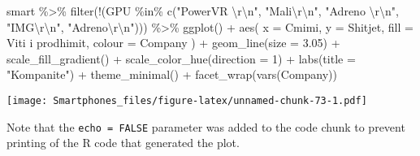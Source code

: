\documentclass[
]{article}
\newenvironment{Shaded}{\begin{snugshade}}{\end{snugshade}}
\newcommand{\AttributeTok}[1]{\textcolor[rgb]{0.77,0.63,0.00}{#1}}
\newcommand{\DecValTok}[1]{\textcolor[rgb]{0.00,0.00,0.81}{#1}}
\newcommand{\FloatTok}[1]{\textcolor[rgb]{0.00,0.00,0.81}{#1}}
\newcommand{\FunctionTok}[1]{\textcolor[rgb]{0.00,0.00,0.00}{#1}}
\newcommand{\NormalTok}[1]{#1}
\newcommand{\SpecialCharTok}[1]{\textcolor[rgb]{0.00,0.00,0.00}{#1}}
\newcommand{\StringTok}[1]{\textcolor[rgb]{0.31,0.60,0.02}{#1}}
\begin{document}
\begin{Shaded}
\begin{Highlighting}[]
\NormalTok{smart }\SpecialCharTok{\%\textgreater{}\%}
 \FunctionTok{filter}\NormalTok{(}\SpecialCharTok{!}\NormalTok{(GPU }\SpecialCharTok{\%in\%} \FunctionTok{c}\NormalTok{(}\StringTok{"PowerVR }\SpecialCharTok{\textbackslash{}r\textbackslash{}n}\StringTok{"}\NormalTok{, }\StringTok{"Mali}\SpecialCharTok{\textbackslash{}r\textbackslash{}n}\StringTok{"}\NormalTok{, }\StringTok{"Adreno }\SpecialCharTok{\textbackslash{}r\textbackslash{}n}\StringTok{"}\NormalTok{, }\StringTok{"IMG}\SpecialCharTok{\textbackslash{}r\textbackslash{}n}\StringTok{"}\NormalTok{, }\StringTok{"Adreno}\SpecialCharTok{\textbackslash{}r\textbackslash{}n}\StringTok{"}\NormalTok{))) }\SpecialCharTok{\%\textgreater{}\%}
 \FunctionTok{ggplot}\NormalTok{() }\SpecialCharTok{+}
  \FunctionTok{aes}\NormalTok{(}
    \AttributeTok{x =}\NormalTok{ Cmimi,}
    \AttributeTok{y =}\NormalTok{ Shitjet,}
    \AttributeTok{fill =} \StringTok{\textasciigrave{}}\AttributeTok{Viti i prodhimit}\StringTok{\textasciigrave{}}\NormalTok{,}
    \AttributeTok{colour =}\NormalTok{ Company}
\NormalTok{  ) }\SpecialCharTok{+}
  \FunctionTok{geom\_line}\NormalTok{(}\AttributeTok{size =} \FloatTok{3.05}\NormalTok{) }\SpecialCharTok{+}
  \FunctionTok{scale\_fill\_gradient}\NormalTok{() }\SpecialCharTok{+}
  \FunctionTok{scale\_color\_hue}\NormalTok{(}\AttributeTok{direction =} \DecValTok{1}\NormalTok{) }\SpecialCharTok{+}
  \FunctionTok{labs}\NormalTok{(}\AttributeTok{title =} \StringTok{"Kompanite"}\NormalTok{) }\SpecialCharTok{+}
  \FunctionTok{theme\_minimal}\NormalTok{() }\SpecialCharTok{+}
  \FunctionTok{facet\_wrap}\NormalTok{(}\FunctionTok{vars}\NormalTok{(Company))}
\end{Highlighting}
\end{Shaded}

\texttt{[image: Smartphones\_files/figure-latex/unnamed-chunk-73-1.pdf]}

Note that the \texttt{echo\ =\ FALSE} parameter was added to the code
chunk to prevent printing of the R code that generated the plot.
\end{document}
